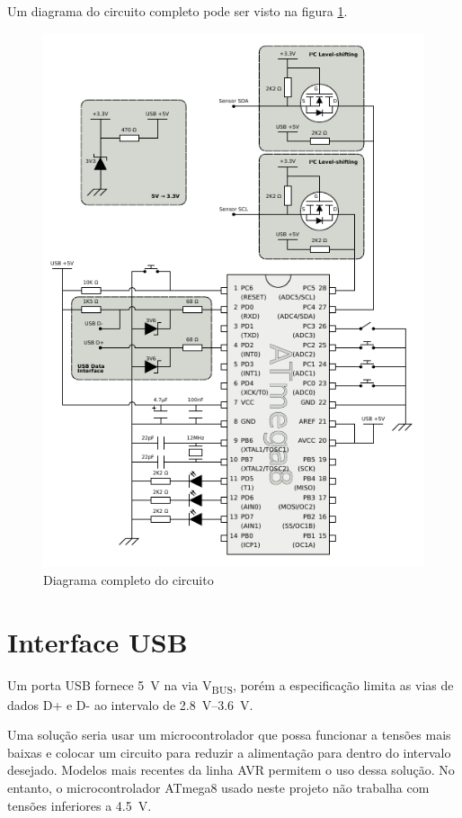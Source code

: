 \documentclass[brazil,pagestart=firstchapter]{abnt}
\newcommand*{\VBUS}{V\textsubscript{BUS}\xspace}
\begin{document}
Um diagrama do circuito completo pode ser visto na figura
\ref{fig:circuito_completo}.

\begin{figure}[h]
\centering
\includegraphics[width=1.0\textwidth]{img/AVR-magnetometer-usb-mouse.pdf}
\caption{Diagrama completo do circuito}
\label{fig:circuito_completo}
\end{figure}


\section{Interface USB}
\label{sec:hardware_usb}

Um porta \ac{USB} fornece \SI{5}{\volt} na via \VBUS, porém a especificação
limita as vias de dados D+ e D- ao intervalo de \SIrange{2.8}{3.6}{\volt}.
\cite[p.~178,~179]{usb20}

Uma solução seria usar um microcontrolador que possa funcionar a tensões
mais baixas e colocar um circuito para reduzir a alimentação para dentro do
intervalo desejado. Modelos mais recentes da linha AVR permitem o uso dessa
solução. \cite[p.~322]{ATmega_newer_datasheets} No entanto, o
microcontrolador ATmega8 usado neste projeto não trabalha com tensões
inferiores a \SI{4.5}{\volt}. \cite{ATmega8}
\end{document}

